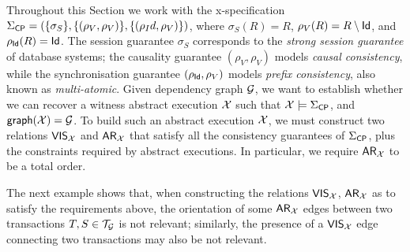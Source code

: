 \documentclass[a4paper,UKenglish]{article}%
\theoremstyle{plain}
\begin{document}
Throughout this Section we work with the x-specification $\Sigma_{\mathsf{CP}} = (\{\sigma_{S}\}, \{(\rho_{V}, \rho_{V})\}, 
\{(\rho_Id, \rho_V)\})$, where $\sigma_{S}(R) = R$, $\rho_V(R) = R \setminus \mathsf{Id}$, and $\rho_{\mathsf{Id}}(R) = \mathsf{Id}$. 
The session guarantee $\sigma_S$ corresponds to the \emph{strong session guarantee} of database systems; 
the causality guarantee $(\rho_{V}, \rho_{V})$ models \emph{causal consistency}, while the synchronisation guarantee 
$(\rho_{\mathsf{Id}}, \rho_V)$ models \emph{prefix consistency}, also known as \emph{multi-atomic}. 
Given dependency graph $\mathcal{G}$, we want to establish whether we can recover a witness abstract 
execution $\mathcal{X}$ such that $\mathcal{X} \models \Sigma_{\mathsf{CP}}$, and $\mathsf{graph}(\mathcal{X}) = \mathcal{G}$. 
To build such an abstract execution $\mathcal{X}$, we must construct two relations ${\mathsf{VIS}}_{\mathcal{X}}$ and 
${\sf{AR}}_{\mathcal{X}}$ that satisfy all the consistency guarantees of $\Sigma_{\mathsf{CP}}$, plus the constraints 
required by abstract executions. In particular, we require ${\sf{AR}}_{\mathcal{X}}$ to be a total order.

The next example shows that, when constructing the relations ${\mathsf{VIS}}_{\mathcal{X}}$, ${\sf{AR}}_{\mathcal{X}}$ as 
to satisfy the requirements above, the orientation of some ${\sf{AR}}_{\mathcal{X}}$ edges between two 
transactions $T,S \in \mathcal{T}_{\mathcal{G}}$ is not relevant; similarly, the presence of a ${\mathsf{VIS}}_{\mathcal{X}}$ edge 
connecting two transactions may also be not relevant.
\end{document}
